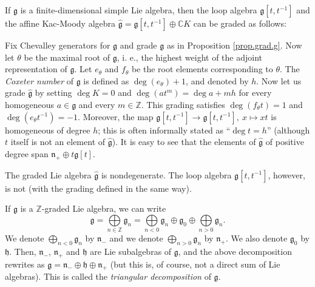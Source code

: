 \documentclass[etingof-lie.tex]{subfiles}
\begin{document}
\begin{proposition}
\label{prop.grad.ghat.simple}If $\mathfrak{g}$ is a finite-dimensional simple
Lie algebra, then the loop algebra $\mathfrak{g}\left[  t,t^{-1}\right]  $ and
the affine Kac-Moody algebra $\widehat{\mathfrak{g}}=\mathfrak{g}\left[
t,t^{-1}\right]  \oplus\mathbb{C}K$ can be graded as follows:

Fix Chevalley generators for $\mathfrak{g}$ and grade $\mathfrak{g}$ as in
Proposition \ref{prop.grad.g}. Now let $\theta$ be the maximal root of
$\mathfrak{g}$, i. e., the highest weight of the adjoint representation of
$\mathfrak{g}$. Let $e_{\theta}$ and $f_{\theta}$ be the root elements
corresponding to $\theta$. The \textit{Coxeter number} of $\mathfrak{g}$ is
defined as $\deg\left(  e_{\theta}\right)  +1$, and denoted by $h$. Now let us
grade $\widehat{\mathfrak{g}}$ by setting $\deg K=0$ and $\deg\left(
at^{m}\right)  =\deg a+mh$ for every homogeneous $a\in\mathfrak{g}$ and every
$m\in\mathbb{Z}$. This grading satisfies $\deg\left(  f_{\theta}t\right)  =1$
and $\deg\left(  e_{\theta}t^{-1}\right)  =-1$. Moreover, the map
$\mathfrak{g}\left[  t,t^{-1}\right]  \rightarrow\mathfrak{g}\left[
t,t^{-1}\right]  ,\ x\mapsto xt$ is homogeneous of degree $h$; this is often
informally stated as ``$\deg t=h$'' (although $t$ itself is not an element of
$\widehat{\mathfrak{g}}$). It is easy to see that the elements of
$\widehat{\mathfrak{g}}$ of positive degree span $\mathfrak{n}_{+}\oplus
t\mathfrak{g}\left[  t\right]  $.

The graded Lie algebra $\widehat{\mathfrak{g}}$ is nondegenerate. The loop
algebra $\mathfrak{g}\left[  t,t^{-1}\right]  $, however, is not (with the
grading defined in the same way).
\end{proposition}

If $\mathfrak{g}$ is a $\mathbb{Z}$-graded Lie algebra, we can write%
\[
\mathfrak{g}=\bigoplus\limits_{n\in\mathbb{Z}}\mathfrak{g}_{n}=\bigoplus
\limits_{n<0}\mathfrak{g}_{n}\oplus\mathfrak{g}_{0}\oplus\bigoplus
\limits_{n>0}\mathfrak{g}_{n}.
\]
We denote $\bigoplus\limits_{n<0}\mathfrak{g}_{n}$ by $\mathfrak{n}_{-}$ and
we denote $\bigoplus\limits_{n>0}\mathfrak{g}_{n}$ by $\mathfrak{n}_{+}$. We
also denote $\mathfrak{g}_{0}$ by $\mathfrak{h}$. Then, $\mathfrak{n}_{-}$,
$\mathfrak{n}_{+}$ and $\mathfrak{h}$ are Lie subalgebras of $\mathfrak{g}$,
and the above decomposition rewrites as $\mathfrak{g}=\mathfrak{n}_{-}%
\oplus\mathfrak{h}\oplus\mathfrak{n}_{+}$ (but this is, of course, not a
direct sum of Lie algebras). This is called the \textit{triangular
decomposition} of $\mathfrak{g}$.
\end{document}
